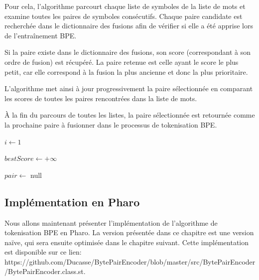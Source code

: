 \documentclass[12pt,a4paper]{report}
\begin{document}
Pour cela, l’algorithme parcourt chaque liste de symboles de la liste de mots et examine toutes les paires de symboles consécutifs. Chaque paire candidate est recherchée dans le dictionnaire des fusions afin de vérifier si elle a été apprise lors de l’entraînement BPE.

Si la paire existe dans le dictionnaire des fusions, son score (correspondant à son ordre de fusion) est récupéré. La paire retenue est celle ayant le score le plus petit, car elle correspond à la fusion la plus ancienne et donc la plus prioritaire.

L’algorithme met ainsi à jour progressivement la paire sélectionnée en comparant les scores de toutes les paires rencontrées dans la liste de mots.

À la fin du parcours de toutes les listes, la paire sélectionnée est retournée comme la prochaine paire à fusionner dans le processus de tokenisation BPE.

\begin{algorithm}[H]
	\caption{FindPairToMerge}
	
	$i \leftarrow 1$\;
	
	$bestScore \leftarrow +\infty$\;
	
	$pair \leftarrow$ null\;
	
	
	
\end{algorithm}

\subsection{Implémentation en Pharo}
Nous allons maintenant présenter l’implémentation de l’algorithme de tokenisation BPE en Pharo. La version présentée dans ce chapitre est une version naïve, qui sera ensuite optimisée dans le chapitre suivant. Cette implémentation est disponible sur ce lien: https://github.com/Ducasse/BytePairEncoder/blob/master/src/BytePairEncoder/BytePairEncoder.class.st.
\end{document}
